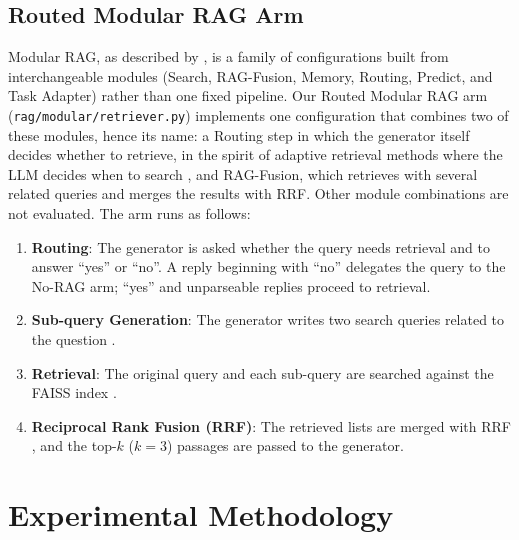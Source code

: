 \documentclass[10pt]{article}
\begin{document}
\subsection{Routed Modular RAG Arm}
Modular RAG, as described by \citet{gao2023retrieval}, is a family of configurations built from interchangeable modules (Search, RAG-Fusion, Memory, Routing, Predict, and Task Adapter) rather than one fixed pipeline. Our Routed Modular RAG arm (\texttt{rag/modular/retriever.py}) implements one configuration that combines two of these modules, hence its name: a Routing step in which the generator itself decides whether to retrieve, in the spirit of adaptive retrieval methods where the LLM decides when to search \citep{asai2023self}, and RAG-Fusion, which retrieves with several related queries and merges the results with RRF. Other module combinations are not evaluated. The arm runs as follows:
\begin{enumerate}
    \item \textbf{Routing}: The generator is asked whether the query needs retrieval and to answer ``yes'' or ``no''. A reply beginning with ``no'' delegates the query to the No-RAG arm; ``yes'' and unparseable replies proceed to retrieval.
    \item \textbf{Sub-query Generation}: The generator writes two search queries related to the question \citep{gao2023retrieval}.
    \item \textbf{Retrieval}: The original query and each sub-query are searched against the FAISS index \citep{johnson2019billion}.
    \item \textbf{Reciprocal Rank Fusion (RRF)}: The retrieved lists are merged with RRF \citep{cormack2009reciprocal}, and the top-$k$ ($k=3$) passages are passed to the generator.
\end{enumerate}

\section{Experimental Methodology}
\label{sec:setup}
\end{document}
